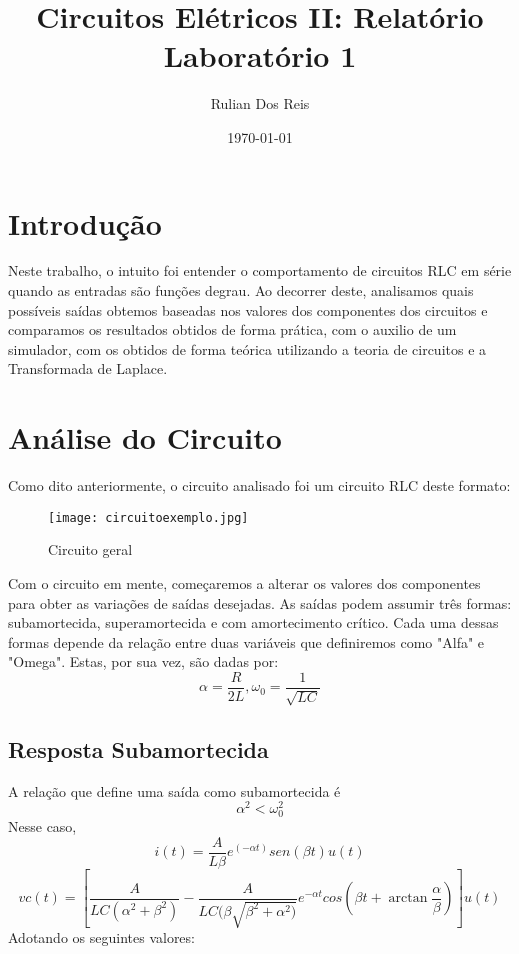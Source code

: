 \documentclass[12pt]{article}
\title{Circuitos Elétricos II: Relatório Laboratório 1}
\author{Rulian Dos Reis}
\date{\today}
\begin{document}
	\maketitle
	\section{Introdução}
	Neste trabalho, o intuito foi entender o comportamento de circuitos RLC em série quando as entradas são funções degrau. Ao decorrer deste, analisamos quais possíveis saídas obtemos baseadas nos valores dos componentes dos circuitos e comparamos os resultados obtidos de forma prática, com o auxilio de um simulador, com os obtidos de forma teórica utilizando a teoria de circuitos e a Transformada de Laplace.
	\section{Análise do Circuito}
	Como dito anteriormente, o circuito analisado foi um circuito RLC deste formato:
	\begin{figure}[!h]
		\centering
		\texttt{[image: circuitoexemplo.jpg]}
		\caption{Circuito geral}
	\end{figure}
	
	Com o circuito em mente, começaremos a alterar os valores dos componentes para obter as variações de saídas desejadas. As saídas podem assumir três formas: subamortecida, superamortecida e com amortecimento crítico. Cada uma dessas formas depende da relação entre duas variáveis que definiremos como "Alfa" e "Omega". Estas, por sua vez, são dadas por:
	\begin{equation}
		\alpha = \frac{R}{2L} , \omega_0 = \frac{1}{\sqrt{LC}}  
	\end{equation}


	\subsection{Resposta Subamortecida}
	A relação que define uma saída como subamortecida é 
	\begin{equation}
		\alpha^2 < \omega_0 ^2
	\end{equation}
	Nesse caso, 
	\begin{equation}
		i(t) = \frac{A}{L\beta}e^{(-\alpha t)}sen(\beta t)u(t)
	\end{equation}
	\begin{equation}
		vc(t) = [\frac{A}{LC(\alpha^2+\beta^2)} - \frac{A}{LC(\beta \sqrt{\beta^2 + \alpha^2)}}e^{-\alpha t}cos(\beta t + \arctan{\frac{\alpha}{\beta}})]u(t)
	\end{equation}
	Adotando os seguintes valores: 
	
\end{document}
